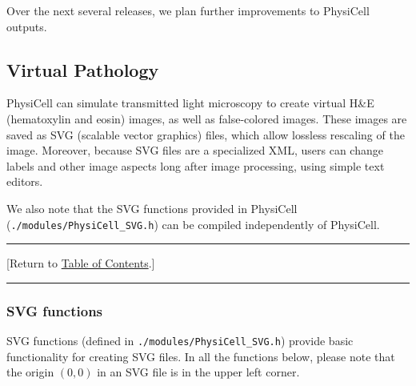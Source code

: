 \documentclass[12pt]{article}
\renewcommand{\v}{\verb}
\newcommand{\blue}[1]{\textcolor{blue}{#1}}
\newcommand{\DONE}{}%
\newcommand{\TOClink}{\begin{center}\hrule\vskip-5pt\phantom{.}\hfill[Return to \hyperlink{TOC}{Table of Contents}.]\hfill\phantom{.}\vskip3pt\hrule\end{center}}
\begin{document}
Over the next several releases, we plan further improvements to 
PhysiCell outputs. 

\subsection{Virtual Pathology} 
\label{sec:Pathology}
PhysiCell can simulate transmitted light microscopy 
to create virtual H\&E (hematoxylin and eosin) images, 
as well as false-colored images. These images 
are saved as SVG (scalable vector graphics) files, 
which allow lossless rescaling of the image. Moreover, 
because SVG files are a specialized XML, users can 
change labels and other image aspects long after image processing, 
using simple text editors. 

We also note that the SVG functions provided in PhysiCell 
(\v|./modules/PhysiCell_SVG.h|) can be compiled independently 
of PhysiCell. 

\TOClink

\subsubsection{SVG functions \DONE}
\label{sec:SVG_functions}
SVG functions (defined in \v|./modules/PhysiCell_SVG.h|) provide basic 
functionality for creating SVG files. In all the functions below, 
please note that the origin $(0,0)$ in an SVG file is in the upper 
left corner. 
\end{document}
